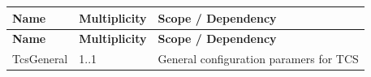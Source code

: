 \begin{longtable}{|l|l|l|}
\hline
\begin{minipage}{0.18\linewidth}\raggedright\vspace{.75ex}\textbf{Name}\vspace{.75ex}\end{minipage} & \begin{minipage}{0.18\linewidth}\raggedright\vspace{.75ex}\textbf{Multiplicity}\vspace{.75ex}\end{minipage} & \begin{minipage}{0.55\linewidth}\raggedright\vspace{.75ex}\textbf{Scope / Dependency}\vspace{.75ex}\end{minipage}\\
\hline\hline
\endfirsthead
\hline
\begin{minipage}{0.18\linewidth}\raggedright\vspace{.75ex}\textbf{Name}\vspace{.75ex}\end{minipage} & \begin{minipage}{0.18\linewidth}\raggedright\vspace{.75ex}\textbf{Multiplicity}\vspace{.75ex}\end{minipage} & \begin{minipage}{0.55\linewidth}\raggedright\vspace{.75ex}\textbf{Scope / Dependency}\vspace{.75ex}\end{minipage}\\
\hline\hline
\endhead
\hline
\endfoot
\hline
\endlastfoot
\begin{minipage}{0.18\linewidth}\raggedright\vspace{.75ex}TcsGeneral\vspace{.75ex}\end{minipage} & \begin{minipage}{0.18\linewidth}\raggedright\vspace{.75ex}1..1\vspace{.75ex}\end{minipage} & \begin{minipage}{0.55\linewidth}\raggedright\vspace{.75ex}General configuration paramers for TCS\vspace{.75ex}\end{minipage}\\\hline
\end{longtable}